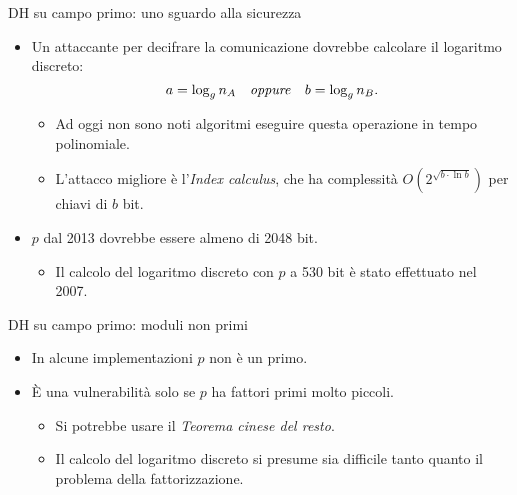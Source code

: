 \documentclass[11pt,svgnames,smaller,aspectratio=169,italian]{beamer}
\begin{document}
\begin{frame}{DH su campo primo: uno sguardo alla sicurezza}
	\begin{itemize}
		\item Un attaccante per decifrare la comunicazione dovrebbe calcolare il logaritmo discreto:
			\begin{equation*}
				a = \log_{g} n_{A}	\quad\text{\emph{oppure}}	\quad b = \log_{g} n_{B}.
			\end{equation*}
			\begin{itemize}
				\item Ad oggi non sono noti algoritmi eseguire questa operazione in tempo polinomiale.
				\item L'attacco migliore è l'\emph{Index calculus}, che ha complessità $O(2^{\sqrt{b \cdot \ln b}})$ per chiavi di $b$ bit.
			\end{itemize}
		\item $p$ dal 2013 dovrebbe essere almeno di 2048 bit.
			\begin{itemize}
				\item Il calcolo del logaritmo discreto con $p$ a 530 bit è stato effettuato nel 2007.
			\end{itemize}
	\end{itemize}
\end{frame}

\begin{frame}{DH su campo primo: moduli non primi}
	\begin{itemize}
		\item In alcune implementazioni $p$ non è un primo.
		\item È una vulnerabilità solo se $p$ ha fattori primi molto piccoli.
			\begin{itemize}
				\item Si potrebbe usare il \emph{Teorema cinese del resto}.
				\item Il calcolo del logaritmo discreto si presume sia difficile tanto quanto il problema della fattorizzazione.
			\end{itemize}
	\end{itemize}
\end{frame}
\end{document}

